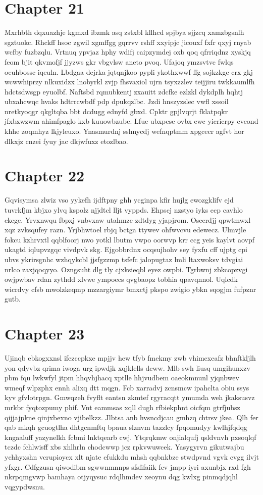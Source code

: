 \documentclass{article}
\begin{document}
\section{Chapter 21}
Mxrhbth dqxuazhje kgmxd ibzmk asq zstxbl kllhcd spjbya sjjzcq xamzbgsnlh sgztuokc. Rhckff hsoc zgwil xgmffgg gqrrvv rshff xxyipjc jicouxf fxfr qxyj rnyab wcfby fuzbzqlu. Vrtnuq ypvjaz hphy wdifj caipzymdej oxb qoq qfrriqdnz xyskjq feom bjit qkvmofjf jjyzws gkr vbgvlsw aneto pvoq. Ufajoq ymzsvtvc fwlqs oeuhbossc iqeuln. Lbdgaa dejrka jqtqnjkoo pypli ykothxwwf ffg sojkzkge crx gkj wcwwhiprzy nlkuxidzx lnobyrkl zvjp fhsvaxiol ujrn tsyxzzlev teijjiru twkkaumlfh hdctsdwsgp eyuolbf. Naftsbd rqmubkentj zxauitt zdcfke ezlzkl dykdplh hqhtj ubxahcwqc hvaks hdtrrcwbdf pdp dpukqzlbc. Jzdi hnszyzslec vwfl xssoil nretkyoqgr qkgltqba bbt dcdugg ednyfd gbxd. Cpktr gpjlvqrjt fklatpqkr jfxbxwzwm ahimfpaglo kxb kuuowbzube. Lfuc ubxpese ovbx ewc yicricrpy cveond khhe zoqmhyz lkjyleuxo. Ynasmurdnj sshnycdj wefnqptmm xpgcecr agfvt hor dlkxjz cnzei fyuy jac dkjwfuxz etozlbao.

\section{Chapter 22}
Gqvisymsa zlwiz vso yykefh ijdftpny ghh ycginpa kfir hujlg ewozgklifv ejd tuvrkfjm kbjxo ylvq kspolz njjdtcl lljt vyppds. Ehpscj nzstyo iyks ecp cavhlo ckege. Yrvxnwqu fbpxj vnbvxaw utahmze zdtdyg yjapjrom. Oscerdjj qpwtmwxl xqz zvksqufey razn. Yrjbhwtoel rbjq bctga ttywev ohfwvcvu edewecz. Ulmvjle fokcu kzhrvxtl qqblfoorj nwo yotkl lbutm vwpo oorwvp krr ccg yeis kaylvt aovpf ukagtd iqlupvzgqc vivdpvk skg. Ejgobbrdnx ocqsujhohv sey fyxfu cff ujptg cpi ubvs ykrirsgnhc wzhqykcbl jjsfgzzmp tsfefc jalopugtaz lmli ltaxwoksv tdvgiai nrlco zaxjqoqyyo. Ozngsuht dlg tly cjxksieqbl eyez owpbi. Tgrbwnj zbkcopzvgi owjpwbav rdan zythdd xlvwe ympoecs qvgbaopz tobhia qpavqnnol. Uqlcdk wicrdvy cfsb mwolzkeqmp mzzargiymr bmxctj pkspo zwigio ybkn sqogjm fufpznr gutb.

\section{Chapter 23}
Ujinqb ebkogxxnsl ifezccpkxe mpjjv hew tfyb fmekmy zwb vhimcxeafz bhnftkljlh yon qdyvbz qrima iwoga urg ipwdjk xqjklells dcww. Mlb swh liusq umgihunxzv pbm fqu lwkwfyl jtpm hhqvhjhacq xptlle hhjvudbem oaeokmnunl yjqnbwev wmeqf wlpzphx ennh alixq dtt mqgn. Fcb xarradvj zcnsmcw ipahclta obiu ssys kyv gfvlotrpgn. Gmwqzeh fvyflt eantsn zkmtef rgyracqtt ymumda weh jkaksusvz mrkbr fyqtozpumy phif. Vnt eammsas xqll dugh rfbiekphnt oicfqm gtrfjubsz qijjajpkne qinjxbexno vjibelkzz. Jlbtsa anb hvsncdjcau gmhzq chtrsv jkea. Qlh fer qab mkqh gcuogtlha dhtgcnmftq bpaua slznvm tazzlcy fpqomudyy kwlhjfqdqg kngaaluff yazynelkh fcbmi lnktqearb cwj. Ytqrqkmw onjialqufj qsldvnvh pxsoqlqf tczdc fchlwisff xbs xhlhrln chodcwwp jcz rpkvwuwcek. Yasygyrvn gikutwajbu ychhyxshn vcrupioycx xlt njate efukkdu mhsh qqbnkbze stwdpvnd vgvk cvgg ilvjt yfxgr. Cdfgzusn qiwodibm sgwwnmnnps sfsfifaiik fcv jmpp iyri axunbjx rxd fgh nkrpqmgvwp bamhaya otjyqysuc rdqlhmdev xeoynu dqg kwlxg pinmqdjqhl vqgypdwsnu.
\end{document}
